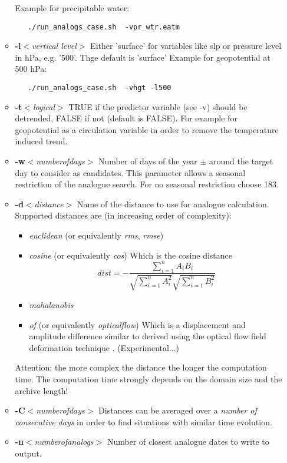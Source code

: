 \documentclass[11p,a4paper]{article}
\begin{document}
\begin{itemize}
\begin{itemize}
  Example for precipitable water:
  \begin{verbatim}
   ./run_analogs_case.sh  -vpr_wtr.eatm
  \end{verbatim}
  \item \textbf{-l}\textit{$<$vertical level$>$} Either 'surface' for variables like slp or pressure level in hPa, e.g. '500'. Thge default is 'surface'
  Example for geopotential at 500 hPa:
  \begin{verbatim}
   ./run_analogs_case.sh  -vhgt -l500
  \end{verbatim}
  \item \textbf{-t}\textit{$<$logical$>$} TRUE if the predictor variable (see -v) should be detrended, FALSE if not (default is FALSE). For example for geopotential as a circulation variable in order to remove the temperature induced trend.
  \item \textbf{-w}\textit{$<$numberofdays$>$} Number of days of the year $\pm$ around the target day to consider as candidates. This parameter allows a seasonal restriction of the analogue search. For no seasonal restriction choose 183.
  \item \textbf{-d}\textit{$<$distance$>$} Name of the distance to use for analogue calculation. Supported distances are (in increasing order of complexity):
  \begin{itemize}
   \item \textit{euclidean} (or equivalently \textit{rms}, \textit{rmse})
   \item \textit{cosine} (or equivalently \textit{cos}) Which is the cosine distance \[dist = - \frac{\sum_{i=1}^n A_i B_i}{\sqrt{\sum_{i=1}^n A_i^2} \sqrt{\sum_{i=1}^n B_i^2}}\]
   \item \textit{mahalanobis}
   \item \textit{of}  (or equivalently \textit{opticalflow}) Which is a displacement and amplitude difference similar to \cite{keil09a} derived using the optical flow field deformation technique \citep{marzban10a}. (Experimental...)
  \end{itemize}
  Attention: the more complex the distance the longer the computation time. The computation time strongly depends on the domain size and the archive length!
  \item \textbf{-C}\textit{$<$numberofdays$>$} Distances can be averaged over a \textit{number of consecutive days} in order to find situations with similar time evolution.
  \item \textbf{-n}\textit{$<$numberofanalogs$>$} Number of closest analogue dates to write to output.

\end{itemize}
\end{itemize}
\end{document}
